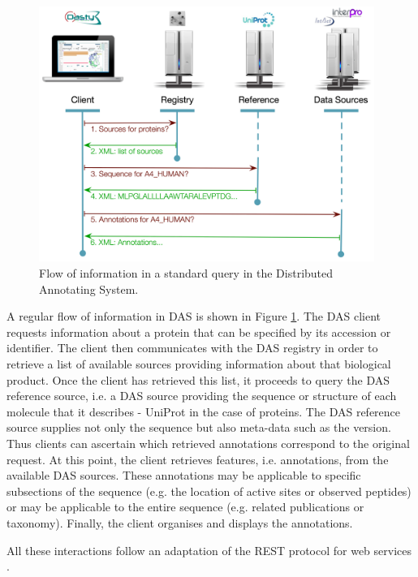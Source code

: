 \begin{figure}  
\centering
\includegraphics[width=4.3in]{figures/DAS.png}
\caption[DAS Flow of Information.]{Flow of information in a standard query in the Distributed Annotating System.
\label{fig:das}}
\end{figure}

A regular flow of information in DAS is shown in Figure \ref{fig:das}. The DAS client requests information about a protein that can be specified by its accession or identifier. The client then communicates with the DAS registry in order to retrieve a list of available sources providing information about that biological product. Once the client has retrieved this list, it proceeds to query the DAS reference source, i.e. a DAS source providing the sequence or structure of each molecule that it describes - UniProt in the case of proteins. The DAS reference source supplies not only the sequence but also meta-data such as the version. Thus clients can ascertain which retrieved annotations correspond to the original request. At this point, the client retrieves features, i.e. annotations, from the available DAS sources. These annotations may be applicable to specific subsections of the sequence (e.g. the location of active sites or observed peptides) or may be applicable to the entire sequence (e.g. related publications or taxonomy). Finally, the client organises and displays the annotations. 

All these interactions follow an adaptation of the REST protocol for web services\cite{PRL2007} .


